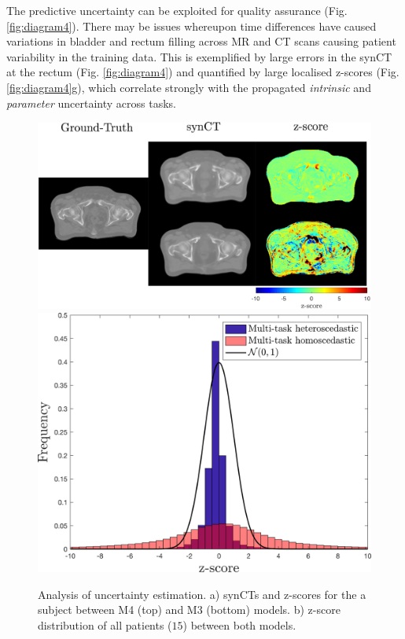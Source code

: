 The predictive uncertainty can be exploited for quality assurance (Fig. \ref{fig:diagram4}). There may be issues whereupon time differences have caused variations in bladder and rectum filling across MR and CT scans causing patient variability in the training data. This is exemplified by large errors in the synCT at the rectum (Fig. \ref{fig:diagram4}) and quantified by large localised z-scores (Fig. \ref{fig:diagram4}g), which correlate strongly with the propagated \emph{intrinsic} and \emph{parameter} uncertainty across tasks.

\begin{figure}[!t]
	\centering
	{\includegraphics[trim=0mm 0mm 0mm 0mm,clip=true,height=0.29\textwidth,keepaspectratio]{chapter_5/figures/new_fig_z_1.pdf}}
	\hspace{0.01\textwidth}
	{\includegraphics[trim=0mm 0mm 0mm 0mm,clip=true,height=0.29\textwidth,keepaspectratio]{chapter_5/figures/fig_z_2.png}}
	\caption{Analysis of uncertainty estimation. a) synCTs and z-scores for the a subject between M4 (top) and M3 (bottom) models. b) z-score distribution of all patients ($15$) between both models.}
	\label{fig:diag3}
\end{figure}


